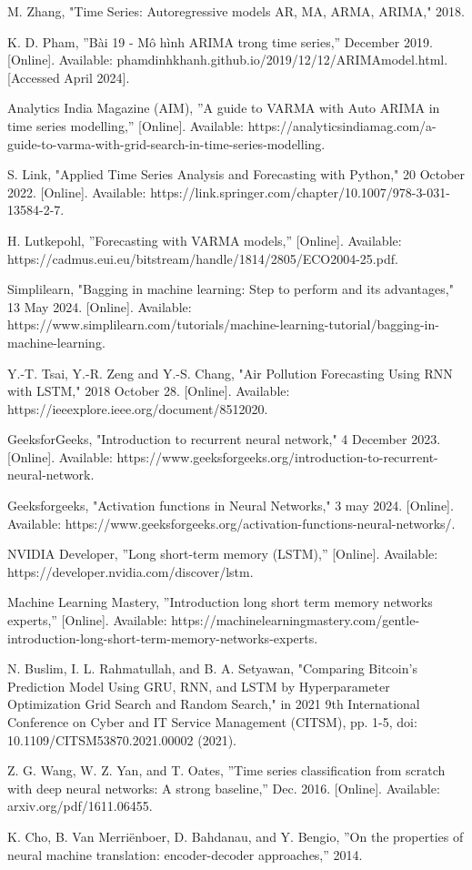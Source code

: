 \documentclass{ieeeojies}
\begin{document}
\begin{thebibliography}{100}
M. Zhang, "Time Series: Autoregressive models AR, MA, ARMA, ARIMA," 2018.

 K. D. Pham, ''Bài 19 - Mô hình ARIMA trong time series,'' December 2019. [Online]. Available: phamdinhkhanh.github.io/2019/12/12/ARIMAmodel.html. [Accessed April 2024].

 Analytics India Magazine (AIM), ''A guide to VARMA with Auto ARIMA in time series modelling,'' [Online]. Available: https://analyticsindiamag.com/a-guide-to-varma-with-grid-search-in-time-series-modelling.

 S. Link, "Applied Time Series Analysis and Forecasting with Python," 20 October 2022. [Online]. Available: https://link.springer.com/chapter/10.1007/978-3-031-13584-2-7.

 H. Lutkepohl, ''Forecasting with VARMA models,'' [Online]. Available: https://cadmus.eui.eu/bitstream/handle/1814/2805/ECO2004-25.pdf.

 Simplilearn, "Bagging in machine learning: Step to perform and its advantages," 13 May 2024. [Online]. Available: https://www.simplilearn.com/tutorials/machine-learning-tutorial/bagging-in-machine-learning.

 Y.-T. Tsai, Y.-R. Zeng and Y.-S. Chang, "Air Pollution Forecasting Using RNN with LSTM," 2018 October 28. [Online]. Available: https://ieeexplore.ieee.org/document/8512020.

 GeeksforGeeks, "Introduction to recurrent neural network," 4 December 2023. [Online]. Available: https://www.geeksforgeeks.org/introduction-to-recurrent-neural-network.

 Geeksforgeeks, "Activation functions in Neural Networks," 3 may 2024. [Online]. Available: https://www.geeksforgeeks.org/activation-functions-neural-networks/.

 NVIDIA Developer, ''Long short-term memory (LSTM),'' [Online]. Available: https://developer.nvidia.com/discover/lstm.

 Machine Learning Mastery, ''Introduction long short term memory networks experts,'' [Online]. Available: https://machinelearningmastery.com/gentle-introduction-long-short-term-memory-networks-experts.

 N. Buslim, I. L. Rahmatullah, and B. A. Setyawan, "Comparing Bitcoin's Prediction Model Using GRU, RNN, and LSTM by Hyperparameter Optimization Grid Search and Random Search," in 2021 9th International Conference on Cyber and IT Service Management (CITSM), pp. 1-5, doi: 10.1109/CITSM53870.2021.00002 (2021).

 Z. G. Wang, W. Z. Yan, and T. Oates, ''Time series classification from scratch with deep neural networks: A strong baseline,'' Dec. 2016. [Online]. Available: arxiv.org/pdf/1611.06455.

 K. Cho, B. Van Merriënboer, D. Bahdanau, and Y. Bengio, ''On the properties of neural machine translation: encoder-decoder approaches,'' 2014.

\end{thebibliography}
\EOD
\end{document}
